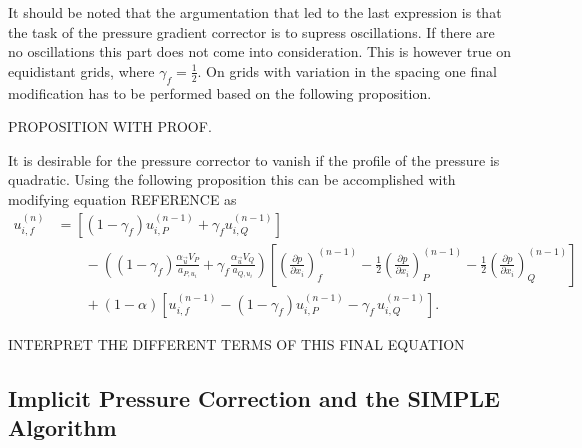   It should be noted that the argumentation that led to the last expression is that the task of the pressure gradient corrector is to supress oscillations. If there are no oscillations this part does not come into consideration. This is however true on equidistant grids, where \(\gamma_f = \frac{1}{2}\). On grids with variation in the spacing one final modification has to be performed based on the following proposition.

  PROPOSITION WITH PROOF.

  It is desirable for the pressure corrector to vanish if the profile of the pressure is quadratic. Using the following proposition this can be accomplished with modifying equation REFERENCE as
  \begin{align}
    u_{i,f}^{(n)} 
    &=
    \left[\left(1 - \gamma_f\right) u_{i,P}^{(n-1)} + \gamma_f u_{i,Q}^{(n-1)} \right] \nonumber\\[1em]
    &\quad\quad - 
    \left(\left(1 - \gamma_f\right) \frac{\alpha_\vec{u} V_P}{a_{P,u_i}} + \gamma_f \frac{\alpha_\vec{u} V_Q}{a_{Q,u_i}}\right)
    \left[ 
    \left(\frac{\partial p}{\partial x_i}\right)_f^{(n-1)} 
    - \frac{1}{2} \left( \frac{\partial p}{\partial x_i} \right)_P^{(n-1)} 
    - \frac{1}{2} \left(\frac{\partial p}{\partial x_i}\right)_Q^{(n-1)}
    \right] \nonumber \\[1em]
    &\quad\quad + \left(1 - \alpha\right) \left[ u_{i,f}^{(n-1)} - \left(1 - \gamma_f\right) u_{i,P}^{(n-1)} - \gamma_f \, u_{i,Q}^{(n-1)} \right].
  \end{align}

  INTERPRET THE DIFFERENT TERMS OF THIS FINAL EQUATION

  \subsection{Implicit Pressure Correction and the SIMPLE Algorithm}
  \label{sec:simple}
  
